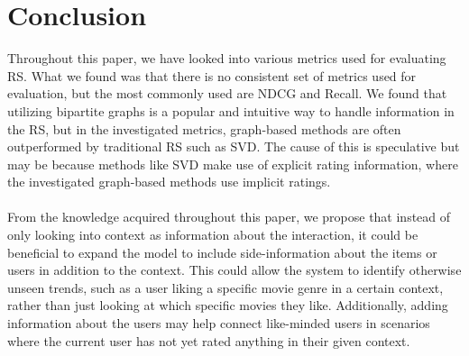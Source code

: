 \section{Conclusion}\label{sec:conclusion}
Throughout this paper, we have looked into various metrics used for evaluating RS. What we found was that there is no consistent set of metrics used for evaluation, but the most commonly used are NDCG and Recall.
We found that utilizing bipartite graphs is a popular and intuitive way to handle information in the RS, but in the investigated metrics, graph-based methods are often outperformed by traditional RS such as SVD.
The cause of this is speculative but may be because methods like SVD make use of explicit rating information, where the investigated graph-based methods use implicit ratings.
\\\\
From the knowledge acquired throughout this paper, we propose that instead of only looking into context as information about the interaction, it could be beneficial to expand the model to include side-information about the items or users in addition to the context.
This could allow the system to identify otherwise unseen trends, such as a user liking a specific movie genre in a certain context, rather than just looking at which specific movies they like.
Additionally, adding information about the users may help connect like-minded users in scenarios where the current user has not yet rated anything in their given context.
